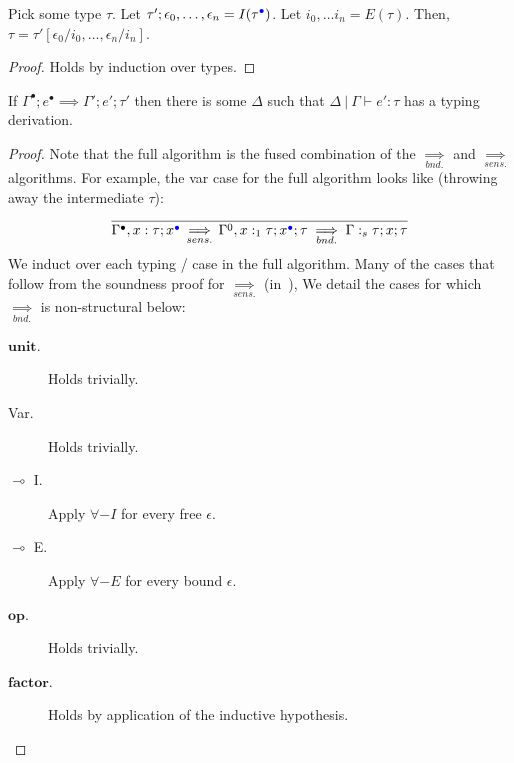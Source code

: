 \begin{lemma}
Pick some type $\tau$.
Let $\tau'; \epsilon_0, \ldots, \epsilon_n = I(\tau^{\textcolor{blue}{\bullet}})$.
Let $i_0, \ldots i_n = E(\tau)$.
Then, $\tau = \tau'[\epsilon_0 / i_0, \ldots, \epsilon_n / i_n]$.
\end{lemma}
\begin{proof}
Holds by induction over types.
\end{proof}

\begin{theorem} \label{thm:algo-soundness}
If $\Gamma^{\bullet}; e^{\bullet} \implies \Gamma'; e'; \tau'$ then there is some
$\Delta$ such that $\Delta \ | \ \Gamma \vdash e' : \tau$ has a typing derivation.
\end{theorem}
\begin{proof}
Note that the full algorithm is the fused combination of the
$\underset{bnd.}{\implies}$ and $\underset{sens.}{\implies}$ algorithms. For
example, the var case for the full algorithm looks like (throwing away the
intermediate $\tau$):
\begin{equation}
\frac
{}
{\Gamma^{\bullet}, x : \tau; x^{\textcolor{blue}{\bullet}} \underset{sens.}{\implies}
\Gamma^0, x :_1 \tau; x^{\textcolor{blue}{\bullet}}; \tau \underset{bnd.}{\implies} \Gamma
:_s \tau; x; \tau}
\end{equation}
We induct over each typing / case in the full algorithm. Many of the cases that
follow from the soundness proof for $\underset{sens.}{\implies}$
(in~\cite{NumFuzz}), We detail the cases for which $\underset{bnd.}{\implies}$
is non-structural below:
\begin{description}
  \item[$\textbf{unit}$.] Holds trivially.
  \item[Var.] Holds trivially.
  \item[$\multimap$ I.] Apply $\forall-I$ for every free $\epsilon$.
  \item[$\multimap$ E.] Apply $\forall-E$ for every bound $\epsilon$.
  \item[$\textbf{op}$.] Holds trivially.
  \item[$\textbf{factor}$.] Holds by application of the inductive hypothesis.
\end{description}
\end{proof}
